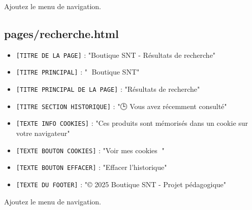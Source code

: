 \documentclass[12pt,a4paper]{article}
\begin{document}
Ajoutez le menu de navigation.

\subsection{pages/recherche.html}

\begin{itemize}
\item \texttt{[TITRE DE LA PAGE]} : "Boutique SNT - Résultats de recherche"
\item \texttt{[TITRE PRINCIPAL]} : "🛒 Boutique SNT"
\item \texttt{[TITRE PRINCIPAL DE LA PAGE]} : "Résultats de recherche"
\item \texttt{[TITRE SECTION HISTORIQUE]} : "🕒 Vous avez récemment consulté"
\item \texttt{[TEXTE INFO COOKIES]} : "Ces produits sont mémorisés dans un cookie sur votre navigateur"
\item \texttt{[TEXTE BOUTON COOKIES]} : "Voir mes cookies 🍪"
\item \texttt{[TEXTE BOUTON EFFACER]} : "Effacer l'historique"
\item \texttt{[TEXTE DU FOOTER]} : "© 2025 Boutique SNT - Projet pédagogique"
\end{itemize}

Ajoutez le menu de navigation.
\end{document}
